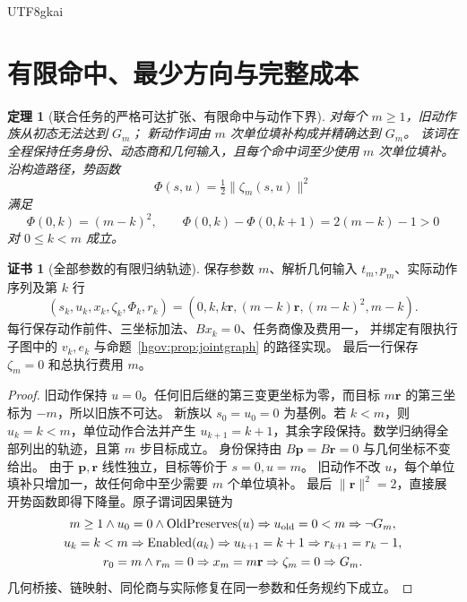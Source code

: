 \documentclass[12pt,a4paper,openany,notitlepage]{report}
\theoremstyle{plain}
\newtheorem{theorem}{定理}[chapter]
\theoremstyle{definition}
\newtheorem*{certificate}{证书}
\theoremstyle{remark}
\begin{document}
\begin{CJK*}{UTF8}{gkai}
\section{有限命中、最少方向与完整成本}

\begin{theorem}[联合任务的严格可达扩张、有限命中与动作下界]
\label{hgov:thm:joint}
对每个 $m\ge1$，旧动作族从初态无法达到 $G_m$；
新动作词由 $m$ 次单位填补构成并精确达到 $G_m$。
该词在全程保持任务身份、动态商和几何输入，且每个命中词至少使用 $m$ 次单位填补。
沿构造路径，势函数
\[
\Phi(s,u)=\tfrac12\|\zeta_m(s,u)\|^2
\]
满足
\[
\Phi(0,k)=(m-k)^2,\qquad
\Phi(0,k)-\Phi(0,k+1)=2(m-k)-1>0
\]
对 $0\le k<m$ 成立。
\end{theorem}
\begin{certificate}[全部参数的有限归纳轨迹]
保存参数 $m$、解析几何输入 $t_m,p_m$、实际动作序列及第 $k$ 行
\[
(s_k,u_k,x_k,\zeta_k,\Phi_k,r_k)
=(0,k,k\mathbf r,(m-k)\mathbf r,(m-k)^2,m-k).
\]
每行保存动作前件、三坐标加法、$Bx_k=0$、任务商像及费用一，
并绑定有限执行子图中的 $v_k,e_k$ 与命题~\ref{hgov:prop:jointgraph} 的路径实现。
最后一行保存 $\zeta_m=0$ 和总执行费用 $m$。
\end{certificate}
\begin{proof}
旧动作保持 $u=0$。任何旧后继的第三变更坐标为零，而目标
$m\mathbf r$ 的第三坐标为 $-m$，所以旧族不可达。
新族以 $s_0=u_0=0$ 为基例。若 $k<m$，则 $u_k=k<m$，单位动作合法并产生
$u_{k+1}=k+1$，其余字段保持。数学归纳得全部列出的轨迹，且第 $m$ 步目标成立。
身份保持由 $B\mathbf p=B\mathbf r=0$ 与几何坐标不变给出。
由于 $\mathbf p,\mathbf r$ 线性独立，目标等价于 $s=0,u=m$。
旧动作不改 $u$，每个单位填补只增加一，故任何命中至少需要 $m$ 个单位填补。
最后 $\|\mathbf r\|^2=2$，直接展开势函数即得下降量。原子谓词因果链为
\[
\begin{gathered}
m\ge1\land u_0=0\land
\operatorname{OldPreserves}(u)
\Rightarrow u_{\rm old}=0<m
\Rightarrow\neg G_m,\\
u_k=k<m
\Rightarrow\operatorname{Enabled}(a_k)
\Rightarrow u_{k+1}=k+1
\Rightarrow r_{k+1}=r_k-1,\\
r_0=m\land r_m=0
\Rightarrow x_m=m\mathbf r
\Rightarrow\zeta_m=0
\Rightarrow G_m .
\end{gathered}
\]
几何桥接、链映射、同伦商与实际修复在同一参数和任务规约下成立。
\end{proof}


\end{CJK*}
\end{document}
